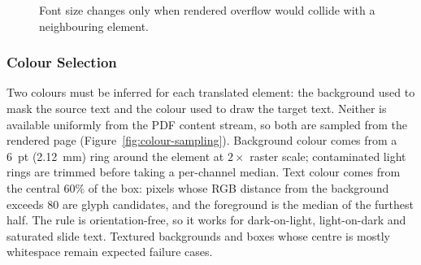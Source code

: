 \begin{figure}[H]
    \centering
    \vspace{0.4em}
    \caption{Font size changes only when rendered overflow would collide with a
    neighbouring element.}
    \label{fig:overflow-collision}
\end{figure}

\subsubsection{Colour Selection}
\label{subsubsec:colour}

Two colours must be inferred for each translated element: the background used to
mask the source text and the colour used to draw the target text. Neither is
available uniformly from the PDF content stream, so both are sampled from the
rendered page (Figure~\ref{fig:colour-sampling}). Background colour comes from a
6~pt (2.12~mm) ring around the element at $2\times$ raster scale; contaminated
light rings
are trimmed before taking a per-channel median. Text colour comes from the
central $60\%$ of the box: pixels whose RGB distance from the background exceeds
80 are glyph candidates, and the foreground is the median of the furthest half.
The rule is orientation-free, so it works for dark-on-light, light-on-dark and
saturated slide text. Textured backgrounds and boxes whose centre is mostly
whitespace remain expected failure cases.

